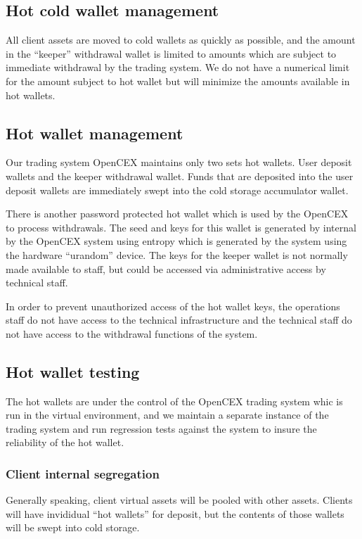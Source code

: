 \subsection{Hot cold wallet management}
All client assets are moved to cold wallets as quickly as possible,
and the amount in the ``keeper'' withdrawal wallet is limited to
amounts which are subject to immediate withdrawal by the trading
system.  We do not have a numerical limit for the amount subject to
hot wallet but will minimize the amounts available in hot wallets.

\subsection{Hot wallet management}
Our trading system OpenCEX maintains only two sets hot
wallets.  User deposit wallets and the keeper withdrawal wallet.
Funds that are deposited into the user deposit wallets are immediately
swept into the cold storage accumulator wallet.

There is another password protected hot wallet which is used by the
OpenCEX to process withdrawals.  The seed and keys for this wallet is
generated by internal by the OpenCEX system using entropy which is
generated by the system using the hardware ``urandom'' device.  The
keys for the keeper wallet is not normally made available to staff,
but could be accessed via administrative access by technical staff.

In order to prevent unauthorized access of the hot wallet keys, the
operations staff do not have access to the technical infrastructure
and the technical staff do not have access to the withdrawal functions
of the system.  

\subsection{Hot wallet testing}
The hot wallets are under the control of the OpenCEX trading system
whic is run in the virtual environment, and we maintain a separate
instance of the trading system and run regression tests against the
system to insure the reliability of the hot wallet.


\subsubsection{Client internal segregation}
Generally speaking, client virtual assets will be pooled with other
assets.  Clients will have invididual ``hot wallets'' for deposit, but
the contents of those wallets will be swept into cold storage.

